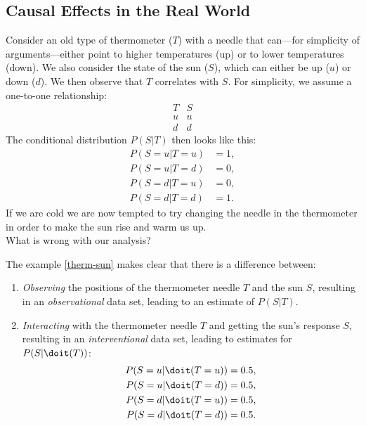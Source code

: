 




\subsection{Causal Effects in the Real World}

\begin{Eg}
    \label{therm-sun}
    Consider an old type of thermometer ($T$) with a needle that can---for simplicity of arguments---either point to higher temperatures (up) or to lower temperatures (down).
    We also consider the state of the sun ($S$), which can either be up ($u$) or down ($d$).
    We then observe that $T$ correlates with $S$. For simplicity, we assume a one-to-one relationship:
    \[\begin{array}{c|c} 
        T & S \\ 
        \hline
        u & u \\
        d & d
    \end{array}\]
    The conditional distribution $P(S|T)$ then looks like this:
    \begin{align*}
        P(S=u|T=u) & = 1, \\
        P(S=u|T=d) & = 0, \\
        P(S=d|T=u) & = 0, \\
        P(S=d|T=d) & = 1.
    \end{align*}
    If we are cold we are now tempted to try changing the needle in the thermometer in order to make the sun rise and warm us up.\\
What is wrong with our analysis?
\end{Eg}

\begin{Disc}
    The example \ref{therm-sun} makes clear that there is a difference between:
    \begin{enumerate}
        \item \emph{Observing} the positions of the thermometer needle $T$ and the sun $S$, resulting in an \emph{observational} data set, 
            leading to an estimate of $P(S|T)$.
        \item \emph{Interacting} with the thermometer needle $T$ and getting the sun's response $S$, resulting in an \emph{interventional} data set, leading to estimates for $P(S|\doit(T))$:
                \begin{align*}
                    P(S=u|\doit(T=u)) & = 0.5, \\
                    P(S=u|\doit(T=d)) & = 0.5, \\
                    P(S=d|\doit(T=u)) & = 0.5, \\
                    P(S=d|\doit(T=d)) & = 0.5.
    \end{align*}
    \end{enumerate}
\end{Disc}

